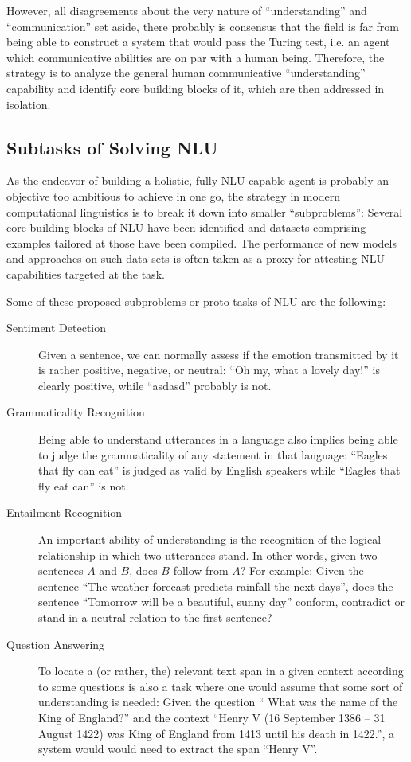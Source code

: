 However, all disagreements about the very nature of ``understanding'' and ``communication'' set aside,
there probably is consensus that the field is far from being able to construct a system that
would pass the Turing test, i.e. an agent which communicative abilities are on par with a human being.
Therefore, the strategy is to analyze the general human communicative ``understanding'' capability
and identify core building blocks of it, which are then addressed in isolation.



\subsection{Subtasks of Solving NLU}

As the endeavor of building a holistic, fully NLU capable agent is probably an objective
too ambitious to achieve in one go, the strategy in modern computational linguistics is
to break it down into smaller ``subproblems'': Several core building blocks of NLU have
been identified and datasets comprising examples tailored at those have been compiled.
The performance of new models and approaches on such data sets is often taken as a proxy
for attesting NLU capabilities targeted at the task.

Some of these proposed subproblems or proto-tasks of NLU are the following:

\begin{description}
  \item[Sentiment Detection] Given a sentence, we can normally assess if the emotion transmitted by
      it is rather positive, negative, or neutral: ``Oh my, what a lovely day!'' is clearly positive,
      while  ``asdasd'' probably is not.
  \item[Grammaticality Recognition] Being able to understand utterances in a language also implies
      being able to judge the grammaticality of any statement in that language: ``Eagles that fly can
      eat'' is judged as valid by English speakers while ``Eagles that fly eat can'' is not.
  \item[Entailment Recognition] An important ability of understanding is the recognition of the
      logical relationship in which two utterances stand. In other words, given two sentences $A$ and
      $B$, does $B$ follow from $A$? For example: Given the sentence ``The weather forecast predicts
      rainfall the next days'', does the sentence ``Tomorrow will be a beautiful, sunny day'' conform,
      contradict or stand in a neutral relation to the first sentence?
  \item[Question Answering] To locate a (or rather, the) relevant text span in a given context according to some
      questions is also a task where one would assume that some sort of understanding is needed:
      Given the question `` What was the name of the King of England?'' and the context ``Henry
      V (16 September 1386 – 31 August 1422) was King of England from 1413 until his death in
      1422.'', a system would would need to extract the span ``Henry V''.
\end{description}

